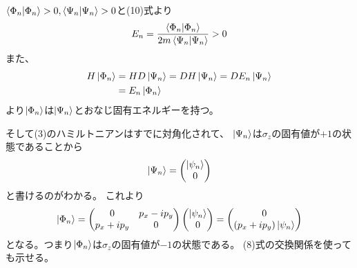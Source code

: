\documentclass[../../sp_2015.tex]{subfiles}
\begin{document}
\subsection{}
\(\braket{\Phi_n}>0,\braket{\Psi_n}>0\)と(10)式より
\begin{equation}\begin{aligned}[b]
    E_n = \frac{\braket{\Phi_n}}{2m\braket{\Psi_n}}>0
\end{aligned}\end{equation}
また、
\begin{equation}\begin{aligned}[b]
    H\ket{\Phi_n}&=HD\ket{\Psi_n}=DH\ket{\Psi_n}=DE_n\ket{\Psi_n}\\
    &= E_n\ket{\Phi_n}
\end{aligned}\end{equation}
より\(\ket{\Phi_n}\)は\(\ket{\Psi_n}\)とおなじ固有エネルギーを持つ。

そして(3)のハミルトニアンはすでに対角化されて、
\(\ket{\Psi_n}\)は\(\sigma_z\)の固有値が\(+1\)の状態であることから
\begin{equation}\begin{aligned}[b]
    \ket{\Psi_n}=\begin{pmatrix}
        \ket{\psi_n}\\0
    \end{pmatrix}
\end{aligned}\end{equation}
と書けるのがわかる。
これより
\begin{equation}\begin{aligned}[b]
    \ket{\Phi_n}=\begin{pmatrix}
        0 & p_x-ip_y\\p_x+ip_y & 0
    \end{pmatrix}\begin{pmatrix}
        \ket{\psi_n}\\0
    \end{pmatrix}
    =\begin{pmatrix}
        0\\(p_x+ip_y)\ket{\psi_n}
    \end{pmatrix}
\end{aligned}\end{equation}
となる。つまり\(\ket{\Phi_n}\)は\(\sigma_z\)の固有値が\(-1\)の状態である。
(8)式の交換関係を使っても示せる。
\end{document}
